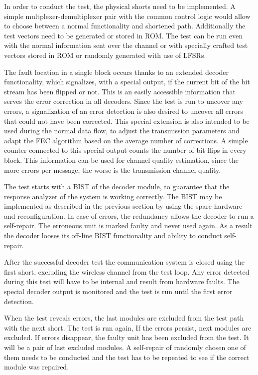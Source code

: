 In order to conduct the test, the physical shorts need to be implemented. A simple multplexer-demultiplexer pair with the common control logic would allow to choose between a normal functionality and shortened path. Additionally the test vectors need to be generated or stored in ROM. The test can be run even with the normal information sent over the channel or with specially crafted test vectors stored in ROM or randomly generated with use of LFSRs.

The fault location in a single block occurs thanks to an extended decoder functionality, which signalizes, with a special output, if the current bit of the bit stream has been flipped or not. This is an easily accessible information that serves the error correction in all decoders. Since the test is run to uncover any errors, a signalization of an error detection is also desired to uncover all errors that could not have been corrected. This special extension is also intended to be used during the normal data flow, to adjust the transmission parameters and adapt the FEC algorithm based on the average number of corrections. A simple counter connected to this special output counts the number of bit flips in every block. This information can be used for channel quality estimation, since the more errors per message, the worse is the transmission channel quality.

The test starts with a BIST of the decoder module, to guarantee that the response analyzer of the system is working correctly. The BIST may be implemented as described in the previous section by using the spare hardware and reconfiguration. In case of errors, the redundancy allows the decoder to run a self-repair. The erroneous unit is marked faulty and never used again. As a result the decoder looses its off-line BIST functionality and ability to conduct self-repair.

After the successful decoder test the communication system is closed using the first short, excluding the wireless channel from the test loop. Any error detected during this test will have to be internal and result from hardware faults. The special decoder output is monitored and the test is run until the first error detection.

When the test reveals errors, the last modules are excluded from the test path with the next short. The test is run again, If the errors persist, next modules are excluded. If errors disappear, the faulty unit has been excluded from the test. It will be a pair of last excluded modules. A self-repair of randomly chosen one of them needs to be conducted and the test has to be repeated to see if the correct module was repaired.


